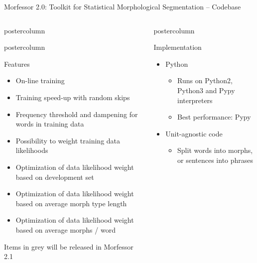 \documentclass[final]{beamer} %
\begin{document}
\begin{frame}{Morfessor 2.0: Toolkit for Statistical Morphological Segmentation -- Codebase}
\begin{columns}
\begin{column}{.3\textwidth}
\begin{beamercolorbox}[center,wd=\textwidth]{postercolumn}
	\end{beamercolorbox}
\vfill

      \begin{beamercolorbox}[center,wd=\textwidth]{postercolumn}
 \begin{block}{Features}
              \begin{itemize}
              \item On-line training
	      \item Training speed-up with random skips
	      \item Frequency threshold and dampening for words in training data
		\item Possibility to weight training data likelihoods
		\item Optimization of data likelihood weight based on development set
		\item \textcolor{mygrey}{Optimization of data likelihood weight based on average morph type length}
		\item \textcolor{mygrey}{Optimization of data likelihood weight based on average morphs / word}
              \end{itemize}              

		{\small \textcolor{mygrey}{Items in grey will be released in Morfessor 2.1}}
            \end{block}
            
	\end{beamercolorbox}

\vfill




\end{column}

\begin{column}{.3\textwidth}

  \begin{beamercolorbox}[center,wd=\textwidth]{postercolumn}
 \begin{block}{Implementation}
              \begin{itemize}
              \item Python
		
                \begin{itemize}
                \item Runs on Python2, Python3 and Pypy interpreters
		\item Best performance: Pypy
                \end{itemize}
              \item Unit-agnostic code
                \begin{itemize}
                \item Split words into morphs, or sentences into phrases
                \end{itemize}
              \end{itemize}              
            \end{block}
            

\end{beamercolorbox}
\end{column}
\end{columns}
\end{frame}
\end{document}
